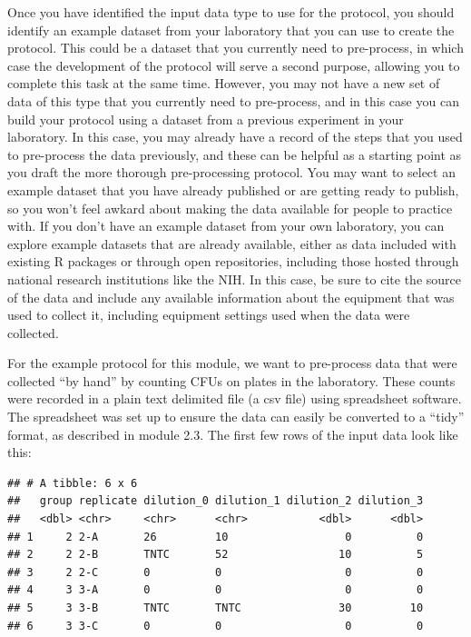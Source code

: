 \documentclass[]{tufte-book}
\begin{document}
Once you have identified the input data type to use for the protocol, you should
identify an example dataset from your laboratory that you can use to create the
protocol. This could be a dataset that you currently need to pre-process, in
which case the development of the protocol will serve a second purpose, allowing
you to complete this task at the same time. However, you may not have a new set
of data of this type that you currently need to pre-process, and in this case
you can build your protocol using a dataset from a previous experiment in your
laboratory. In this case, you may already have a record of the steps that you
used to pre-process the data previously, and these can be helpful as a starting
point as you draft the more thorough pre-processing protocol. You may want to
select an example dataset that you have already published or are getting ready
to publish, so you won't feel awkard about making the data available for people
to practice with. If you don't have an example dataset from your own laboratory,
you can explore example datasets that are already available, either as data
included with existing R packages or through open repositories, including those
hosted through national research institutions like the NIH. In this case, be
sure to cite the source of the data and include any available information about
the equipment that was used to collect it, including equipment settings used
when the data were collected.

For the example protocol for this module, we want to pre-process data that were
collected ``by hand'' by counting CFUs on plates in the laboratory. These counts
were recorded in a plain text delimited file (a csv file) using spreadsheet
software. The spreadsheet was set up to ensure the data can easily be converted
to a ``tidy'' format, as described in module 2.3. The first few rows of the input
data look like this:

\begin{verbatim}
## # A tibble: 6 x 6
##   group replicate dilution_0 dilution_1 dilution_2 dilution_3
##   <dbl> <chr>     <chr>      <chr>           <dbl>      <dbl>
## 1     2 2-A       26         10                  0          0
## 2     2 2-B       TNTC       52                 10          5
## 3     2 2-C       0          0                   0          0
## 4     3 3-A       0          0                   0          0
## 5     3 3-B       TNTC       TNTC               30         10
## 6     3 3-C       0          0                   0          0
\end{verbatim}
\end{document}
